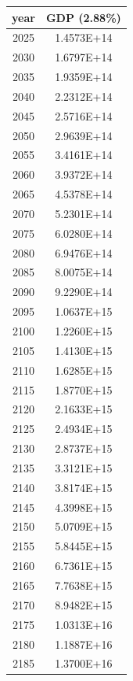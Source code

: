 \documentclass[a4paper]{article}
\begin{document}
	\pagebreak
	
	\small
	
	\noindent
	\begin{tabular}{|c|c|}
		\hline
		year & GDP (2.88\%) \\
		\hline
		2025 & 1.4573E+14 \\
		\hline
		2030 & 1.6797E+14 \\
		\hline
		2035 & 1.9359E+14 \\
		\hline
		2040 & 2.2312E+14 \\
		\hline
		2045 & 2.5716E+14 \\
		\hline
		2050 & 2.9639E+14 \\
		\hline
		2055 & 3.4161E+14 \\
		\hline
		2060 & 3.9372E+14 \\
		\hline
		2065 & 4.5378E+14 \\
		\hline
		2070 & 5.2301E+14 \\
		\hline
		2075 & 6.0280E+14 \\
		\hline
		2080 & 6.9476E+14 \\
		\hline
		2085 & 8.0075E+14 \\
		\hline
		2090 & 9.2290E+14 \\
		\hline
		2095 & 1.0637E+15 \\
		\hline
		2100 & 1.2260E+15 \\
		\hline
		2105 & 1.4130E+15 \\
		\hline
		2110 & 1.6285E+15 \\
		\hline
		2115 & 1.8770E+15 \\
		\hline
		2120 & 2.1633E+15 \\
		\hline
		2125 & 2.4934E+15 \\
		\hline
		2130 & 2.8737E+15 \\
		\hline
		2135 & 3.3121E+15 \\
		\hline
		2140 & 3.8174E+15 \\
		\hline
		2145 & 4.3998E+15 \\
		\hline
		2150 & 5.0709E+15 \\
		\hline
		2155 & 5.8445E+15 \\
		\hline
		2160 & 6.7361E+15 \\
		\hline
		2165 & 7.7638E+15 \\
		\hline
		2170 & 8.9482E+15 \\
		\hline
		2175 & 1.0313E+16 \\
		\hline
		2180 & 1.1887E+16 \\
		\hline
		2185 & 1.3700E+16 \\

\end{tabular}
\end{document}
